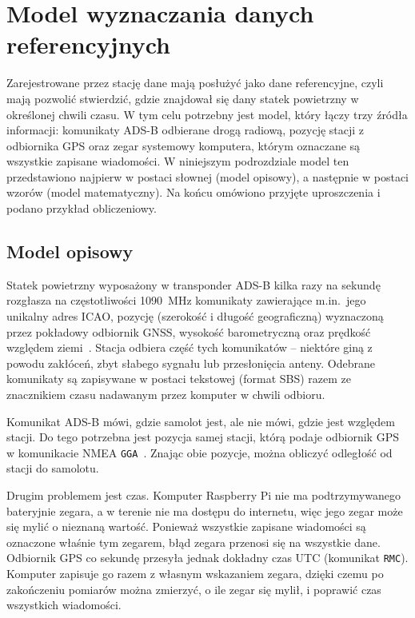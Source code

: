 \newenvironment{objasnienia}{%
  \noindent gdzie:
  \begin{description}[font=\normalfont, labelindent=\parindent,
    labelwidth=1.2cm, labelsep=0.2cm, leftmargin=!, align=left,
    itemsep=0pt, topsep=2pt]}{\end{description}}

\section{Model wyznaczania danych referencyjnych}
\label{sec:model}

Zarejestrowane przez stację dane mają posłużyć jako dane referencyjne, czyli
mają pozwolić stwierdzić, gdzie znajdował się dany statek powietrzny
w określonej chwili czasu.
W tym celu potrzebny jest model, który łączy trzy źródła informacji:
komunikaty ADS-B odbierane drogą radiową, pozycję stacji z odbiornika GPS oraz
zegar systemowy komputera, którym oznaczane są wszystkie zapisane wiadomości.
W niniejszym podrozdziale model ten przedstawiono najpierw w postaci słownej
(model opisowy), a następnie w postaci wzorów (model matematyczny). Na końcu
omówiono przyjęte uproszczenia i podano przykład obliczeniowy.

\subsection{Model opisowy}
\label{sec:model_opisowy}

Statek powietrzny wyposażony w transponder ADS-B kilka razy na sekundę
rozgłasza na częstotliwości \SI{1090}{MHz} komunikaty zawierające m.in.\ jego
unikalny adres ICAO, pozycję (szerokość i długość geograficzną) wyznaczoną
przez pokładowy odbiornik GNSS, wysokość barometryczną oraz prędkość
względem ziemi~\cite{sun2021}. Stacja odbiera część tych komunikatów --
niektóre giną z powodu zakłóceń, zbyt słabego sygnału lub przesłonięcia
anteny. Odebrane komunikaty są zapisywane w postaci tekstowej (format SBS)
razem ze znacznikiem czasu nadawanym przez komputer w chwili odbioru.

Komunikat ADS-B mówi, gdzie samolot jest, ale nie mówi, gdzie jest
względem stacji. Do tego potrzebna jest pozycja samej stacji, którą
podaje odbiornik GPS w komunikacie NMEA \texttt{GGA}~\cite{nmea0183}.
Znając obie pozycje, można obliczyć odległość od stacji do samolotu.

Drugim problemem jest czas. Komputer Raspberry Pi nie ma podtrzymywanego
bateryjnie zegara, a w terenie nie ma dostępu do internetu, więc jego zegar
może się mylić o nieznaną wartość. Ponieważ wszystkie zapisane wiadomości są
oznaczone właśnie tym zegarem, błąd zegara przenosi się na wszystkie dane.
Odbiornik GPS co sekundę przesyła jednak dokładny czas UTC (komunikat
\texttt{RMC}). Komputer zapisuje go razem z własnym wskazaniem zegara, dzięki
czemu po zakończeniu pomiarów można zmierzyć, o ile zegar się mylił,
i poprawić czas wszystkich wiadomości.

